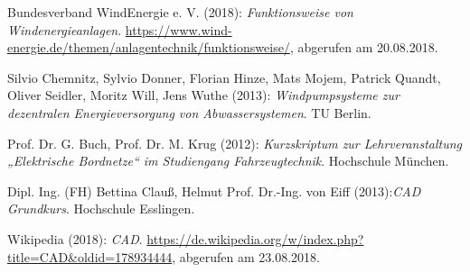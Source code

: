 
\begin{thebibliography}{999}
\label{WindEnergie}
Bundesverband WindEnergie e. V.  (2018): \textit{Funktionsweise von Windenergieanlagen}.\newline
\url{https://www.wind-energie.de/themen/anlagentechnik/funktionsweise/},\newline 
abgerufen am 20.08.2018.

\label{Windpumpsysteme}
Silvio Chemnitz, Sylvio Donner, Florian Hinze, Mats Mojem, Patrick Quandt, Oliver Seidler, Moritz Will, Jens Wuthe (2013): \textit{Windpumpsysteme zur dezentralen Energieversorgung von Abwassersystemen}. TU Berlin.

\label{Bordnetze}
Prof. Dr. G. Buch, Prof. Dr. M. Krug (2012): \textit{Kurzskriptum zur Lehrveranstaltung „Elektrische Bordnetze“ im Studiengang Fahrzeugtechnik}. Hochschule München.

\label{CAD}
Dipl. Ing. (FH) Bettina Clauß, Helmut Prof. Dr.-Ing. von Eiff (2013):\textit{CAD Grundkurs}. Hochschule Esslingen.

Wikipedia  (2018): \textit{CAD}.\newline
\url{https://de.wikipedia.org/w/index.php?title=CAD&oldid=178934444},\newline 
abgerufen am 23.08.2018.


\end{thebibliography}
